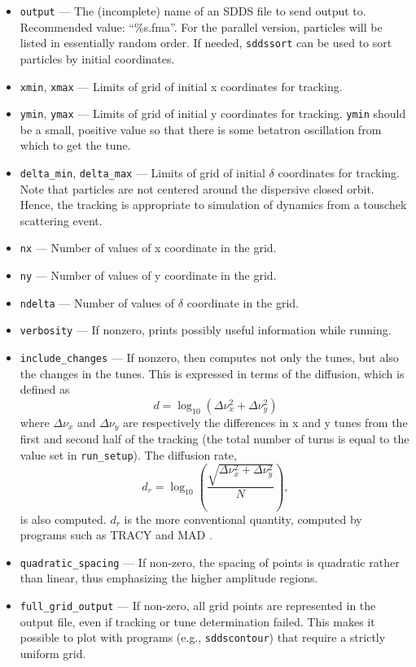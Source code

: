 \documentclass[11pt]{article}
\begin{document}
\begin{itemize}
\item \verb|output| --- The (incomplete) name of an SDDS file to send output to.  
 Recommended value: ``\%s.fma''.  For the parallel version, particles will be listed in essentially
 random order.  If needed, \verb|sddssort| can be used to sort particles by initial coordinates.
\item \verb|xmin|, \verb|xmax| --- Limits of grid of initial x coordinates for tracking.             
\item \verb|ymin|, \verb|ymax| --- Limits of grid of initial y coordinates for tracking.             
 \verb|ymin| should be a small, positive value so that there                               
 is some betatron oscillation from which to get the tune.                      
\item \verb|delta_min|, \verb|delta_max| --- Limits of grid of initial $\delta$ coordinates
for tracking.  Note that particles are not centered around the dispersive closed orbit.  Hence,
the tracking is appropriate to simulation of dynamics from a touschek scattering event.
\item \verb|nx| --- Number of values of x coordinate in the grid.
\item \verb|ny| --- Number of values of y coordinate in the grid.
\item \verb|ndelta| --- Number of values of $\delta$ coordinate in the grid.
\item \verb|verbosity| --- If nonzero, prints possibly useful information while running.
\item \verb|include_changes| --- If nonzero, then computes not only the tunes, but also
        the changes in the tunes.  This is expressed in terms of the diffusion, which is defined
        as 
\begin{equation}
  d = \log_{10} \left(\Delta\nu_x^2 + \Delta\nu_y^2\right)
\end{equation}
where $\Delta\nu_x$ and $\Delta\nu_y$ are respectively the differences in x and y tunes
from the first and second half of the tracking (the total number of turns is equal to the
value set in \verb|run_setup|).
The diffusion rate, 
\begin{equation}
  d_r = \log_{10} \left(\frac{\sqrt{\Delta\nu_x^2 + \Delta\nu_y^2}}{N}\right),
\end{equation} is also computed. $d_r$ is the more conventional quantity, computed by
programs such as TRACY and MAD \cite{BuesingPC}.
\item \verb|quadratic_spacing| --- If non-zero, the spacing of points is quadratic rather than linear, thus emphasizing
  the higher amplitude regions.
\item \verb|full_grid_output| --- If non-zero, all grid points are represented in the output file, even if tracking or
  tune determination failed. This makes it possible to plot with programs (e.g., \verb|sddscontour|) that require
  a strictly uniform grid.
\end{itemize}
\end{document}
